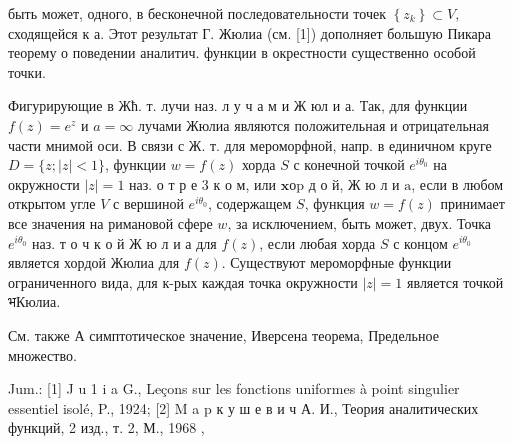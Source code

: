 \documentclass[10pt]{article}
\begin{document}
быть может, одного, в бесконечной последовательности точек $\left\{z_{k}\right\} \subset V$, сходящейся к $а$. Этот результат Г. Жюлиа (см. [1]) дополняет большую Пикара теорему о поведении аналитич. функции в окрестности существенно особой точки.



Фигурирующие в Жћ. т. лучи наз. л у ч а м и Ж юл и а. Так, для функции $f(z)=e^{z}$ и $a=\infty$ лучами Жюлиа являются положительная и отрицательная части мнимой оси. В связи с Ж. т. для мероморфной, напр. в единичном круге $D=\{z ;|z|<1\}$, функции $w=f(z)$ хорда $S$ с конечной точкой $e^{i \theta_{0}}$ на окружности $|z|=1$ наз. о т р е 3 к о м, или $\mathbf{x} о \mathrm{p}$ д о й, Ж ю л и $\mathrm{a}$, если в любом открытом угле $V$ с вершиной $e^{i \theta_{0}}$, содержащем $S$, функция $w=f(z)$ принимает все значения на римановой сфере $w$, за исключением, быть может, двух. Точка $e^{i \theta_{0}}$ наз. т о ч к о й Ж ю л и а для $f(z)$, если любая хорда $S$ с концом $e^{i \theta_{0}}$ является хордой Жюлиа для $f(z)$. Существуют мероморфные функции ограниченного вида, для к-рых каждая точка окружности $|z|=1$ является точкой भКюлиа.



См. также А симптотическое значение, Иверсена теорема, Предельное множество.



Jum.: [1] J u 1 i a G., Leçons sur les fonctions uniformes à point singulier essentiel isolé, P., 1924; [2] M a p к у ш е в и ч А. И., Теория аналитических функций, 2 изд., т. 2, М., 1968 ,
\end{document}
